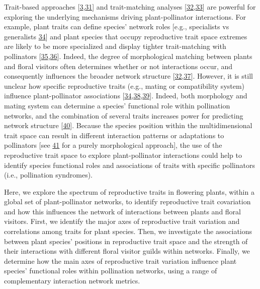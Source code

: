 \documentclass[
  12pt,
  a4paper,
]{article}
\begin{document}
Trait-based approaches {[}\protect\hyperlink{ref-fenster2004}{3},\protect\hyperlink{ref-rosas2014}{31}{]} and trait-matching analyses {[}\protect\hyperlink{ref-stang2009}{32},\protect\hyperlink{ref-bartomeus2016}{33}{]} are powerful for exploring the underlying mechanisms driving plant-pollinator interactions. For example, plant traits can define species' network roles {[}e.g., specialists vs generalists \protect\hyperlink{ref-tur2013}{34}{]} and plant species that occupy reproductive trait space extremes are likely to be more specialized and display tighter trait-matching with pollinators {[}\protect\hyperlink{ref-junker2013}{35},\protect\hyperlink{ref-coux2016}{36}{]}. Indeed, the degree of morphological matching between plants and floral visitors often determines whether or not interactions occur, and consequently influences the broader network structure {[}\protect\hyperlink{ref-stang2009}{32},\protect\hyperlink{ref-ibanez2012}{37}{]}. However, it is still unclear how specific reproductive traits (e.g., mating or compatibility system) influence plant-pollinator associations {[}\protect\hyperlink{ref-tur2013}{34},\protect\hyperlink{ref-sargent2008}{38},\protect\hyperlink{ref-devaux2014}{39}{]}. Indeed, both morphology and mating system can determine a species' functional role within pollination networks, and the combination of several traits increases power for predicting network structure {[}\protect\hyperlink{ref-eklof2013}{40}{]}. Because the species position within the multidimensional trait space can result in different interaction patterns or adaptations to pollinators {[}see \protect\hyperlink{ref-dehling2016}{41} for a purely morphological approach{]}, the use of the reproductive trait space to explore plant-pollinator interactions could help to identify species functional roles and associations of traits with specific pollinators (i.e., pollination syndromes).

Here, we explore the spectrum of reproductive traits in flowering plants, within a global set of plant-pollinator networks, to identify reproductive trait covariation and how this influences the network of interactions between plants and floral visitors. First, we identify the major axes of reproductive trait variation and correlations among traits for plant species. Then, we investigate the associations between plant species' positions in reproductive trait space and the strength of their interactions with different floral visitor guilds within networks. Finally, we determine how the main axes of reproductive trait variation influence plant species' functional roles within pollination networks, using a range of complementary interaction network metrics.
\end{document}
